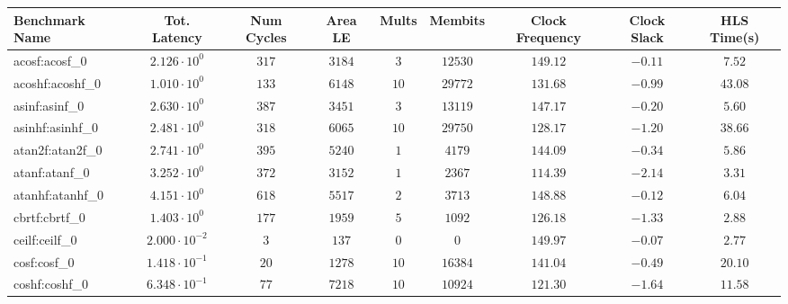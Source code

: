 \begin{tabular}{|l|c|c|c|c|c|c|c|c|}
\hline
Benchmark Name               & Tot. Latency            & Num Cycles & Area LE    & Mults   & Membits    & Clock Frequency & Clock Slack & HLS Time(s) \\
\hline
acosf:acosf\_0               & $ 2.126 \cdot 10^{0}  $ & $ 317    $ & $ 3184   $ & $ 3   $ & $ 12530  $ & $ 149.12      $ & $ -0.11   $ & $ 7.52    $ \\
acoshf:acoshf\_0             & $ 1.010 \cdot 10^{0}  $ & $ 133    $ & $ 6148   $ & $ 10  $ & $ 29772  $ & $ 131.68      $ & $ -0.99   $ & $ 43.08   $ \\
asinf:asinf\_0               & $ 2.630 \cdot 10^{0}  $ & $ 387    $ & $ 3451   $ & $ 3   $ & $ 13119  $ & $ 147.17      $ & $ -0.20   $ & $ 5.60    $ \\
asinhf:asinhf\_0             & $ 2.481 \cdot 10^{0}  $ & $ 318    $ & $ 6065   $ & $ 10  $ & $ 29750  $ & $ 128.17      $ & $ -1.20   $ & $ 38.66   $ \\
atan2f:atan2f\_0             & $ 2.741 \cdot 10^{0}  $ & $ 395    $ & $ 5240   $ & $ 1   $ & $ 4179   $ & $ 144.09      $ & $ -0.34   $ & $ 5.86    $ \\
atanf:atanf\_0               & $ 3.252 \cdot 10^{0}  $ & $ 372    $ & $ 3152   $ & $ 1   $ & $ 2367   $ & $ 114.39      $ & $ -2.14   $ & $ 3.31    $ \\
atanhf:atanhf\_0             & $ 4.151 \cdot 10^{0}  $ & $ 618    $ & $ 5517   $ & $ 2   $ & $ 3713   $ & $ 148.88      $ & $ -0.12   $ & $ 6.04    $ \\
cbrtf:cbrtf\_0               & $ 1.403 \cdot 10^{0}  $ & $ 177    $ & $ 1959   $ & $ 5   $ & $ 1092   $ & $ 126.18      $ & $ -1.33   $ & $ 2.88    $ \\
ceilf:ceilf\_0               & $ 2.000 \cdot 10^{-2} $ & $ 3      $ & $ 137    $ & $ 0   $ & $ 0      $ & $ 149.97      $ & $ -0.07   $ & $ 2.77    $ \\
cosf:cosf\_0                 & $ 1.418 \cdot 10^{-1} $ & $ 20     $ & $ 1278   $ & $ 10  $ & $ 16384  $ & $ 141.04      $ & $ -0.49   $ & $ 20.10   $ \\
coshf:coshf\_0               & $ 6.348 \cdot 10^{-1} $ & $ 77     $ & $ 7218   $ & $ 10  $ & $ 10924  $ & $ 121.30      $ & $ -1.64   $ & $ 11.58   $ \\

\end{tabular}
